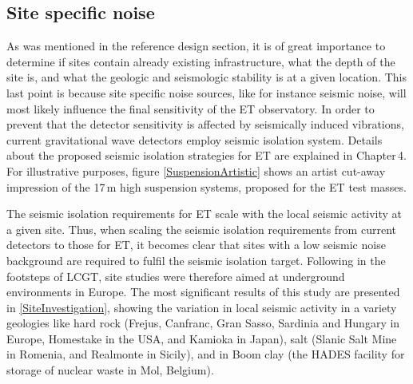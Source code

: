 \FloatBarrier
\subsection{Site specific noise}
As was mentioned in the reference design section, it is of great importance to determine if sites contain already existing infrastructure, what the depth of the site is, and what the geologic and seismologic stability is at a given location. This last point is because site specific noise sources, like for instance seismic noise, will most likely influence the final sensitivity of the ET observatory. In order to prevent that the detector sensitivity is affected by seismically induced vibrations, current gravitational wave detectors employ seismic isolation system. Details about the proposed seismic isolation strategies for ET are explained in Chapter\,4. For illustrative purposes, figure \ref{SuspensionArtistic} shows an artist cut-away impression of the 17\,m high suspension systems, proposed for the ET test masses. 


The seismic isolation requirements for ET scale with the local seismic activity at a given site. Thus, when scaling the seismic isolation requirements from current detectors to those for ET, it becomes clear that sites with a low seismic noise background are required to fulfil the seismic isolation target. Following in the footsteps of LCGT, site studies were therefore aimed at underground environments in Europe. The most significant results of this study are presented in \ref{SiteInvestigation}, showing the variation in local seismic activity in a variety geologies like hard rock (Frejus, Canfranc, Gran Sasso, Sardinia and Hungary in Europe, Homestake in the USA, and Kamioka in Japan), salt (Slanic Salt Mine in Romenia, and Realmonte in Sicily), and in Boom clay (the HADES facility for storage of nuclear waste in Mol, Belgium).  

